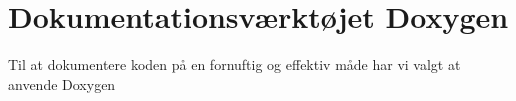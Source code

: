 \section{Dokumentationsværktøjet Doxygen}

Til at dokumentere koden på en fornuftig og effektiv måde har vi valgt at anvende Doxygen \citep{doxygenWeb}